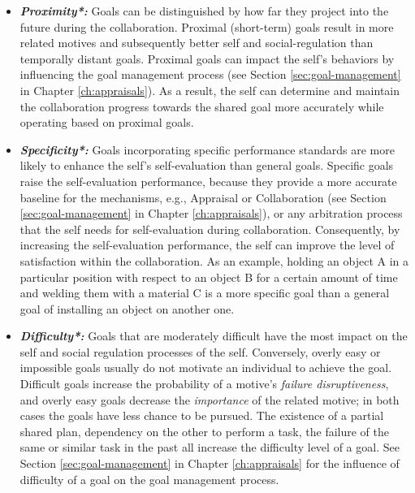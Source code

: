 \documentclass[12pt]{report}
\begin{document}
\begin{itemize}
  \item \textbf{\textit{Proximity*:}} Goals can be distinguished by how far they
  project into the future during the collaboration. Proximal (short-term) goals
  result in more related motives and subsequently better self and
  social-regulation than temporally distant goals. Proximal goals can impact
  the self's behaviors by influencing the goal management process (see Section
  \ref{sec:goal-management} in Chapter \ref{ch:appraisals}). As a result, the
  self can determine and maintain the collaboration progress towards the shared
  goal more accurately while operating based on proximal goals.
  
  \item \textbf{\textit{Specificity*:}} Goals incorporating specific performance
  standards are more likely to enhance the self's self-evaluation than general
  goals. Specific goals raise the self-evaluation performance, because they
  provide a more accurate baseline for the mechanisms, e.g., Appraisal or
  Collaboration (see Section \ref{sec:goal-management} in Chapter
  \ref{ch:appraisals}), or any arbitration process that the self needs for
  self-evaluation during collaboration. Consequently, by increasing the
  self-evaluation performance, the self can improve the level of satisfaction
  within the collaboration. As an example, holding an object A in a particular
  position with respect to an object B for a certain amount of time and welding
  them with a material C is a more specific goal than a general goal of
  installing an object on another one.
  
  \item \textbf{\textit{Difficulty*:}} Goals that are moderately difficult have
  the most impact on the self and social regulation processes of the self.
  Conversely, overly easy or impossible goals usually do not motivate an
  individual to achieve the goal. Difficult goals increase the probability of a
  motive's \textit{failure disruptiveness}, and overly easy goals decrease the
  \textit{importance} of the related motive; in both cases the goals have less
  chance to be pursued. The existence of a partial shared plan, dependency on
  the other to perform a task, the failure of the same or similar task in the
  past all increase the difficulty level of a goal. See Section
  \ref{sec:goal-management} in Chapter \ref{ch:appraisals} for the influence of
  difficulty of a goal on the goal management process.
\end{itemize}
\end{document}
